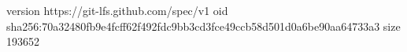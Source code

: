 version https://git-lfs.github.com/spec/v1
oid sha256:70a32480fb9e4fcff62f492fdc9bb3cd3fce49ccb58d501d0a6be90aa64733a3
size 193652
